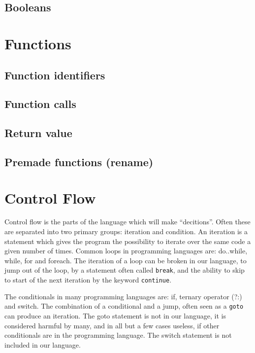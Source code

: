 \subsection{Booleans}

\section{Functions}
\subsection{Function identifiers}

\subsection{Function calls}

\subsection{Return value}

\subsection{Premade functions (rename)}


\section{Control Flow}
Control flow is the parts of the language which will make ``decitions''.
Often these are separated into two primary groups: iteration and condition. 
An iteration is a statement which gives the program the possibility to iterate over the same code a given number of times. 
Common loops in programming languages are: do..while, while, for and foreach. 
The iteration of a loop can be broken in our language, to jump out of the loop, by a statement often called \texttt{break}, and the ability to skip to start of the next iteration by the keyword \texttt{continue}.

The conditionals in many programming languages are: if, ternary operator (?:) and switch.
The combination of a conditional and a jump, often seen as a \texttt{goto} can produce an iteration. 
The goto statement is not in our language, it is considered harmful by many, and in all but a few cases useless, if other conditionals are in the programming language. \citep{DijkstraGoto}
The switch statement is not included in our language. 

